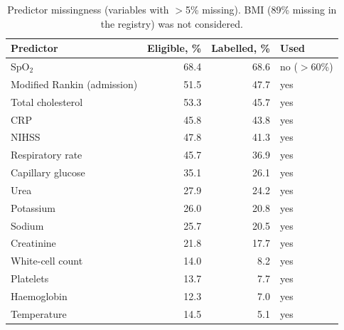 \begin{table}[htbp]\centering\small
\caption{Predictor missingness (variables with $>$5\% missing). BMI (89\% missing in the registry) was not considered.}\label{tab:missing}
\begin{tabular}{lrrl}
\toprule
Predictor & Eligible, \% & Labelled, \% & Used \\
\midrule
SpO$_2$ & 68.4 & 68.6 & no ($>$60\%) \\
Modified Rankin (admission) & 51.5 & 47.7 & yes \\
Total cholesterol & 53.3 & 45.7 & yes \\
CRP & 45.8 & 43.8 & yes \\
NIHSS & 47.8 & 41.3 & yes \\
Respiratory rate & 45.7 & 36.9 & yes \\
Capillary glucose & 35.1 & 26.1 & yes \\
Urea & 27.9 & 24.2 & yes \\
Potassium & 26.0 & 20.8 & yes \\
Sodium & 25.7 & 20.5 & yes \\
Creatinine & 21.8 & 17.7 & yes \\
White-cell count & 14.0 & 8.2 & yes \\
Platelets & 13.7 & 7.7 & yes \\
Haemoglobin & 12.3 & 7.0 & yes \\
Temperature & 14.5 & 5.1 & yes \\
\bottomrule
\end{tabular}
\end{table}
